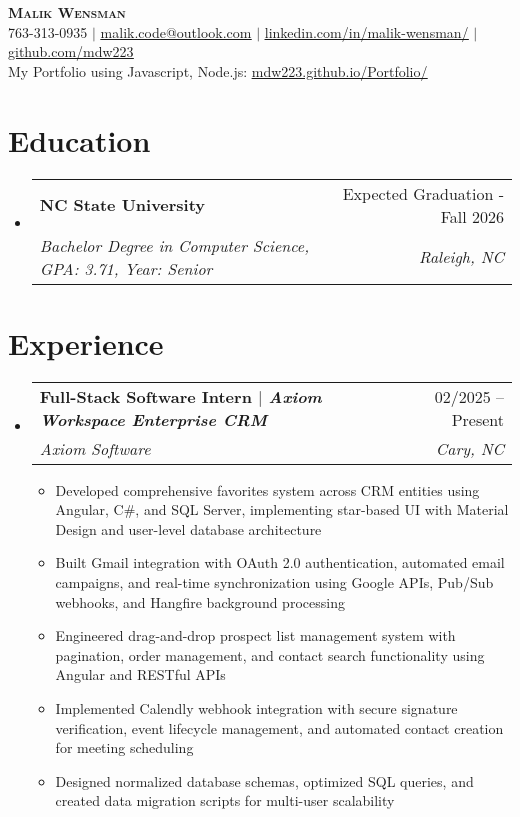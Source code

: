 \documentclass[letterpaper,11pt]{article}
\makeatletter
\newcommand{\resumeItem}[1]{
  \item\small{
    {#1 \vspace{-2pt}}
  }
}
\newcommand{\resumeSubheading}[4]{
  \vspace{-2pt}\item
    \begin{tabular*}{0.97\textwidth}[t]{l@{\extracolsep{\fill}}r}
      \textbf{#1} & #2 \\
      \textit{\small#3} & \textit{\small #4} \\
    \end{tabular*}\vspace{-7pt}
}
\newcommand{\resumeSubHeadingListStart}{\begin{itemize}[leftmargin=0.15in, label={}]}
\newcommand{\resumeSubHeadingListEnd}{\end{itemize}}
\newcommand{\resumeItemListStart}{\begin{itemize}}
\newcommand{\resumeItemListEnd}{\end{itemize}\vspace{-5pt}}
\makeatother
\begin{document}

\begin{center}
    \textbf{\Huge \scshape Malik Wensman} \\ \vspace{1pt}
    \small 763-313-0935 $|$ \href{mailto:malik.code@outlook.com}{\underline{malik.code@outlook.com}} $|$ 
    \href{https://www.linkedin.com/in/malik-wensman/}{\underline{linkedin.com/in/malik-wensman/}} $|$
    \href{https://github.com/mdw223}{\underline{github.com/mdw223}}
    \small \\ My Portfolio using Javascript, Node.js: 
    \href{https://mdw223.github.io/Portfolio/}{\underline{mdw223.github.io/Portfolio/}}
\end{center}


\section{Education}
  \resumeSubHeadingListStart
    \resumeSubheading
      {NC State University}{Expected Graduation - Fall 2026}
      {Bachelor Degree in Computer Science, GPA: 3.71, Year: Senior}{Raleigh, NC}
  \resumeSubHeadingListEnd

\section{Experience}
  \resumeSubHeadingListStart
    \resumeSubheading
      {\textbf{Full-Stack Software Intern} $|$ \emph{Axiom Workspace Enterprise CRM}}
      {02/2025 – Present}
      {Axiom Software}{Cary, NC}
      \resumeItemListStart
        \resumeItem{Developed comprehensive favorites system across CRM entities using Angular, C\#, and SQL Server, implementing star-based UI with Material Design and user-level database architecture}
        \resumeItem{Built Gmail integration with OAuth 2.0 authentication, automated email campaigns, and real-time synchronization using Google APIs, Pub/Sub webhooks, and Hangfire background processing}
        \resumeItem{Engineered drag-and-drop prospect list management system with pagination, order management, and contact search functionality using Angular and RESTful APIs}
        \resumeItem{Implemented Calendly webhook integration with secure signature verification, event lifecycle management, and automated contact creation for meeting scheduling}
        \resumeItem{Designed normalized database schemas, optimized SQL queries, and created data migration scripts for multi-user scalability}
    \resumeItemListEnd
  \resumeSubHeadingListEnd
\end{document}
